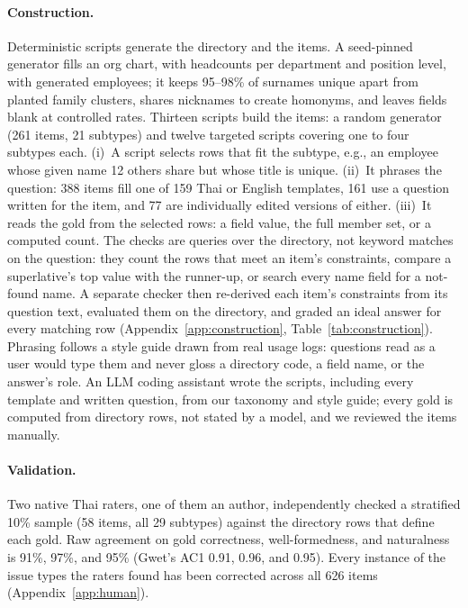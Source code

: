 \documentclass[11pt]{article}
\begin{document}
\paragraph{Construction.} Deterministic scripts generate the directory and the items. A seed-pinned
generator fills an org chart, with headcounts per department and position level, with generated
employees; it keeps 95--98\% of surnames unique apart from planted family clusters, shares nicknames to
create homonyms, and leaves fields blank at controlled rates. Thirteen scripts build the items: a random
generator (261 items, 21 subtypes) and twelve targeted scripts covering one to four subtypes each.
(i)~A script selects rows that fit the subtype, e.g., an employee whose given name 12 others share but
whose title is unique. (ii)~It phrases the question: 388 items fill one of 159 Thai or English templates, 161 use a question written for the item, and 77 are individually edited versions of either. (iii)~It reads the gold from the selected rows: a field value, the full member set, or a
computed count. The checks are queries over the directory, not keyword matches on the question: they
count the rows that meet an item's constraints, compare a superlative's top value with the runner-up, or
search every name field for a not-found name. A separate checker then re-derived each item's constraints
from its question text, evaluated them on the directory, and graded an ideal answer for every matching
row (Appendix~\ref{app:construction}, Table~\ref{tab:construction}). Phrasing follows a style guide drawn
from real usage logs: questions read as a user would type them and never gloss a directory code, a field
name, or the answer's role. An LLM coding assistant wrote the scripts, including every template and written question, from our taxonomy and style guide; every gold is
computed from directory rows, not stated by a model, and we reviewed the items manually.

\paragraph{Validation.} Two native Thai raters, one of them an author, independently checked a stratified 10\% sample (58 items, all 29 subtypes) against the
directory rows that define each gold. Raw agreement on gold correctness, well-formedness, and
naturalness is 91\%, 97\%, and 95\% (Gwet's AC1 0.91, 0.96, and 0.95). Every instance of the issue types the
raters found has been corrected across all 626 items (Appendix~\ref{app:human}).
\end{document}
